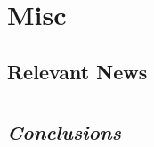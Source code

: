 \chapter{Misc}
%
\section{Relevant News}
\paragraph{}

\section{}

\chapter{}
\section*{\centering \textit{Conclusions}}

\vspace*{50px} %
\printbibliography


